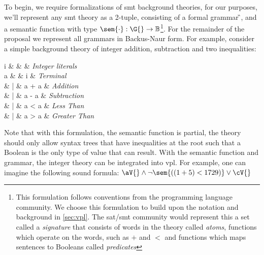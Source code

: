 To begin, we require formalizations of \ac{smt} background theories, for our
purposes, we'll represent any \ac{smt} theory as a 2-tuple, consisting of a
formal grammar \G{}, and a semantic function with type $\sem{\cdot} : \G{}
\rightarrow \mathbb{B}$\footnote{This formulation follows conventions from the
  programming language community. We choose this formulation to build upon the
  notation and background in \autoref{sec:vpl}. The \ac{sat}/\ac{smt} community
  would represent this a set called a \emph{signature} that consists of words in
  the theory called \emph{atoms}, functions which operate on the words, such as
  $+$ and $<$ and functions which maps sentences to Booleans called
  \emph{predicates}}. For the remainder of the proposal we represent all
grammars in Backus-Naur form. For example, consider a simple background theory
of integer addition, subtraction and two inequalities:
%
\begin{syntax}
  i & \in{} & 
  & \textit{Integer literals} \\[1.5ex]

  a & \Coloneqq{} & i    & \textit{Terminal} \\
  & | & a + a     & \textit{Addition} \\
  & | & a -{} a     & \textit{Subtraction} \\
  & | & a < a     & \textit{Less Than} \\
  & | & a > a   & \textit{Greater Than} \\
\end{syntax}
%
Note that with this formulation, the semantic function is partial, the theory
should only allow syntax trees that have inequalities at the root such that a
Boolean is the only type of value that can result. With the semantic function
and grammar, the integer theory can be integrated into \ac{vpl}. For example,
one can imagine the following sound formula: $\aV{} \wedge \neg \sem{((1 + 5) <
  1729)} \vee \cV{}$

